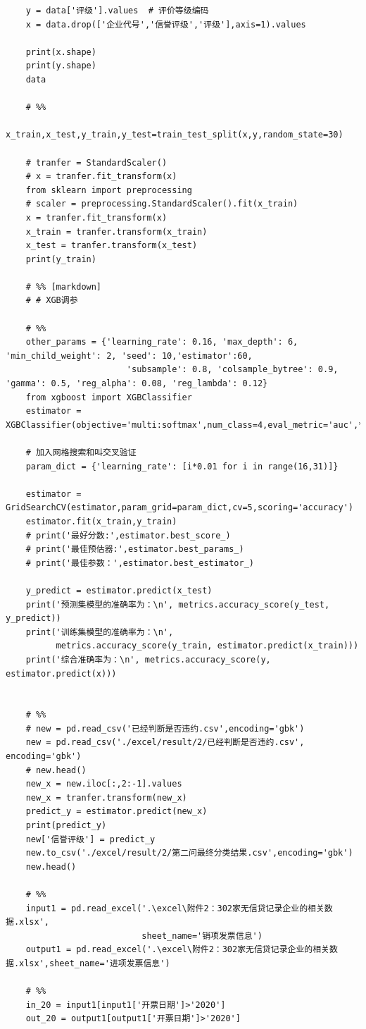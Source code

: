 \documentclass[UTF8]{ctexart}
\begin{document}
\begin{lstlisting}
	y = data['评级'].values  # 评价等级编码
	x = data.drop(['企业代号','信誉评级','评级'],axis=1).values
	
	print(x.shape)
	print(y.shape)
	data
	
	# %%
	x_train,x_test,y_train,y_test=train_test_split(x,y,random_state=30)
	
	# tranfer = StandardScaler()
	# x = tranfer.fit_transform(x)
	from sklearn import preprocessing
	# scaler = preprocessing.StandardScaler().fit(x_train)
	x = tranfer.fit_transform(x)
	x_train = tranfer.transform(x_train)
	x_test = tranfer.transform(x_test)
	print(y_train)
	
	# %% [markdown]
	# # XGB调参
	
	# %%
	other_params = {'learning_rate': 0.16, 'max_depth': 6, 'min_child_weight': 2, 'seed': 10,'estimator':60,
						'subsample': 0.8, 'colsample_bytree': 0.9, 'gamma': 0.5, 'reg_alpha': 0.08, 'reg_lambda': 0.12}
	from xgboost import XGBClassifier
	estimator = XGBClassifier(objective='multi:softmax',num_class=4,eval_metric='auc',**other_params)
	
	# 加入网格搜索和叫交叉验证
	param_dict = {'learning_rate': [i*0.01 for i in range(16,31)]}
	
	estimator = GridSearchCV(estimator,param_grid=param_dict,cv=5,scoring='accuracy')
	estimator.fit(x_train,y_train)
	# print('最好分数:',estimator.best_score_)
	# print('最佳预估器:',estimator.best_params_)
	# print('最佳参数：',estimator.best_estimator_)
	
	y_predict = estimator.predict(x_test)
	print('预测集模型的准确率为：\n', metrics.accuracy_score(y_test, y_predict))
	print('训练集模型的准确率为：\n',
		  metrics.accuracy_score(y_train, estimator.predict(x_train)))
	print('综合准确率为：\n', metrics.accuracy_score(y, estimator.predict(x)))
	
	
	# %%
	# new = pd.read_csv('已经判断是否违约.csv',encoding='gbk')
	new = pd.read_csv('./excel/result/2/已经判断是否违约.csv', encoding='gbk')
	# new.head()
	new_x = new.iloc[:,2:-1].values
	new_x = tranfer.transform(new_x)
	predict_y = estimator.predict(new_x)
	print(predict_y)
	new['信誉评级'] = predict_y
	new.to_csv('./excel/result/2/第二问最终分类结果.csv',encoding='gbk')
	new.head()
	
	# %%
	input1 = pd.read_excel('.\excel\附件2：302家无信贷记录企业的相关数据.xlsx',
						   sheet_name='销项发票信息')
	output1 = pd.read_excel('.\excel\附件2：302家无信贷记录企业的相关数据.xlsx',sheet_name='进项发票信息')
	
	# %%
	in_20 = input1[input1['开票日期']>'2020']
	out_20 = output1[output1['开票日期']>'2020']
	

\end{lstlisting}
\end{document}
